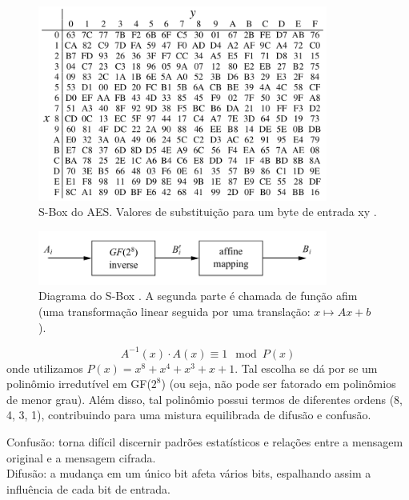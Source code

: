 \begin{frame}[allowframebreaks]
 \framebreak

\begin{figure}[h]
\centering
\includegraphics[width=0.85\textwidth,height=0.65\textheight,keepaspectratio]{figures/AES-SBox.png}
\caption{S-Box do AES. Valores de substituição para um byte de entrada xy \cite{paar2014}.}
\label{fig-AES-SBox}
\end{figure}

 \framebreak

\begin{figure}[h]
\centering
\includegraphics[width=0.85\textwidth,height=0.65\textheight,keepaspectratio]{figures/AES-SBox-operations.png}
\caption{Diagrama do S-Box \cite{paar2014}. A segunda parte é chamada de função afim (uma transformação linear seguida por uma translação: $x \mapsto Ax + b$).}
\label{fig-AES-SBox-operations}
\end{figure}

 \framebreak

\begin{equation}
A^{-1} (x) \cdot A(x) \equiv 1 \mod P(x)
\end{equation}
onde utilizamos $P(x) = x^8 + x^4 + x^3 + x + 1$. 
Tal escolha se dá por se um polinômio irredutível em GF($2^8$) (ou seja, não pode ser
fatorado em polinômios de menor grau). Além disso, tal polinômio possui termos de diferentes ordens (8, 4, 3, 1), 
contribuindo para uma mistura equilibrada de difusão e confusão.

Confusão: torna difícil discernir padrões estatísticos e relações entre a mensagem original e a mensagem cifrada.\\
Difusão: a mudança em um único bit afeta vários bits, espalhando assim a influência de cada bit de entrada.


\end{frame}
